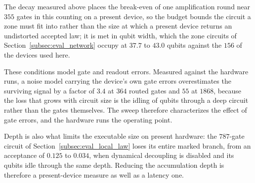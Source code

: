 The decay measured above places the break-even of one amplification round near
$355$ gates in this counting on a present device, so the budget bounds the
circuit a zone must fit into rather than the size at which a present device
returns an undistorted accepted law; it is met in qubit width, which the zone
circuits of Section~\ref{subsec:eval_network} occupy at $37.7$ to $43.0$
qubits against the $156$ of the devices used here.


These conditions model gate and readout errors. Measured against the hardware
runs, a noise model carrying the device's own gate errors overestimates the
surviving signal by a factor of $3.4$ at $364$ routed gates and $55$ at
$1868$, because the loss that grows with circuit size is the idling of qubits
through a deep circuit rather than the gates themselves. The sweep therefore
characterizes the effect of gate errors, and the hardware runs the operating
point.


Depth is also what limits the executable size on present hardware: the
$787$-gate circuit of Section~\ref{subsec:eval_local_law} loses its entire
marked branch, from an acceptance of $0.125$ to $0.034$, when dynamical
decoupling is disabled and its qubits idle through the same depth. Reducing
the accumulation depth is therefore a present-device measure as well as a
latency one.


\caption{Inter-cell circuit under simulated noise, with 10\,000 shots per
condition and one amplification round. TVD is computed after the decoded
feasibility check.}


